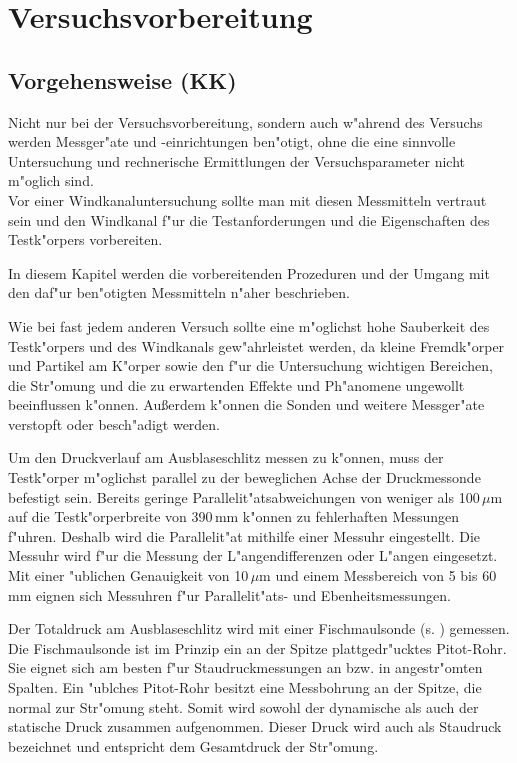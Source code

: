 \section{Versuchsvorbereitung}
\label{sec:Versuchsvorbereitung}
\subsection{Vorgehensweise (KK)}
Nicht nur bei der Versuchsvorbereitung, sondern auch w"ahrend des Versuchs werden Messger"ate und -einrichtungen ben"otigt, ohne die eine sinnvolle Untersuchung und rechnerische Ermittlungen der Versuchsparameter nicht m"oglich sind.\\
Vor einer Windkanaluntersuchung sollte man mit diesen Messmitteln vertraut sein und den Windkanal f"ur die Testanforderungen und die Eigenschaften des Testk"orpers vorbereiten.

In diesem Kapitel werden die vorbereitenden Prozeduren und der Umgang mit den daf"ur ben"otigten Messmitteln n"aher beschrieben.

Wie bei fast jedem anderen Versuch sollte eine m"oglichst hohe Sauberkeit des Testk"orpers und des Windkanals gew"ahrleistet werden, da kleine Fremdk"orper und Partikel am K"orper sowie den f"ur die Untersuchung wichtigen Bereichen, die Str"omung und die zu erwartenden Effekte und Ph"anomene ungewollt beeinflussen k"onnen. Au\ss{}erdem k"onnen die Sonden und weitere Messger"ate verstopft oder besch"adigt werden.

Um den Druckverlauf am Ausblaseschlitz messen zu k"onnen, muss der Testk"orper m"oglichst parallel zu der beweglichen Achse der Druckmessonde befestigt sein. Bereits geringe Parallelit"atsabweichungen von weniger als 100\,$\mu$m auf die Testk"orperbreite von 390\,mm k"onnen zu fehlerhaften Messungen f"uhren. Deshalb wird die Parallelit"at mithilfe einer Messuhr eingestellt. Die Messuhr wird f"ur die Messung der L"angendifferenzen oder L"angen eingesetzt. Mit einer "ublichen Genauigkeit von 10\,$\mu$m und einem Messbereich von 5 bis 60\,mm eignen sich Messuhren f"ur Parallelit"ats- und Ebenheitsmessungen.

Der Totaldruck am Ausblaseschlitz wird mit einer Fischmaulsonde (s. ) gemessen. Die Fischmaulsonde ist im Prinzip ein an der Spitze plattgedr"ucktes Pitot-Rohr. Sie eignet sich am besten f"ur Staudruckmessungen an bzw. in angestr"omten Spalten. Ein "ublches Pitot-Rohr besitzt eine Messbohrung an der Spitze, die normal zur Str"omung steht. Somit wird sowohl der dynamische als auch der statische Druck zusammen aufgenommen. Dieser Druck wird auch als Staudruck bezeichnet und entspricht dem Gesamtdruck der Str"omung.

